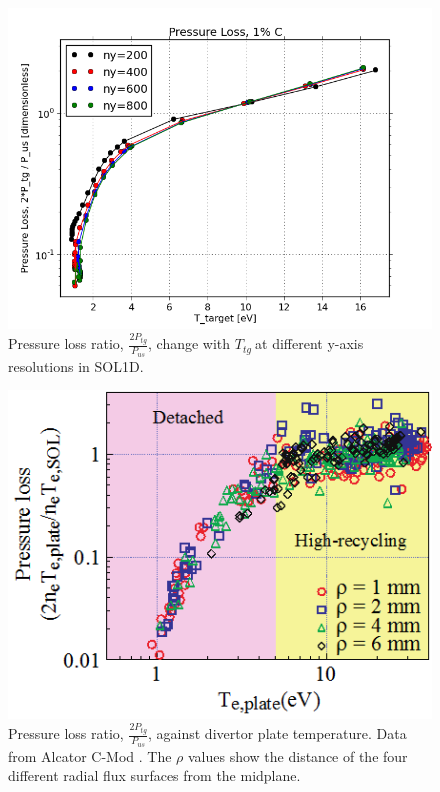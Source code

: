 \documentclass[12pt]{article}  %
\providecommand{\Ttg}{$T_{tg}~$} %
\begin{document}
\begin{figure}
\includegraphics[scale=0.5]{Figures/sol1d/PL_IMPCOMBO2logy.png}
\centering
\caption{Pressure loss ratio, $\frac{2P_{tg}}{P_{us}}$, change with \Ttg at different y-axis resolutions in SOL1D.}\label{figPL_IMPCOMBO2logy}
\end{figure}

\begin{figure}
\includegraphics[scale=0.7]{Figures/PlossAlcator.png}
\centering
\caption{Pressure loss ratio, $\frac{2P_{tg}}{P_{us}}$, against divertor plate temperature. Data from Alcator C-Mod \cite{Lipschultz2007}. The $\rho $ values show the distance of the four different radial flux surfaces from the midplane.}\label{figPlossAlcator}
\end{figure}
\end{document}
